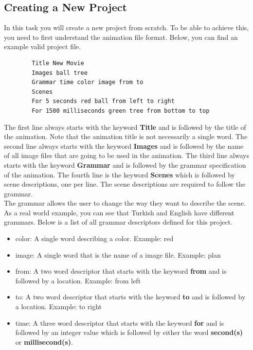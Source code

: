 \documentclass[a4paper]{article}
\begin{document}
	
	\subsection{Creating a New Project}
	In this task you will create a new project from scratch. To be able to achieve this, you need to first understand the animation file format. Below, you can find an example valid project file.\\
	\label{example}
	\begin{lstlisting}
		Title New Movie
		Images ball tree
		Grammar time color image from to
		Scenes
		For 5 seconds red ball from left to right
		For 1500 milliseconds green tree from bottom to top
	\end{lstlisting}
	
	The first line always starts with the keyword \textbf{Title} and is followed by the title of the animation. Note that the animation title is not necessarily a single word. The second line always starts with the keyword \textbf{Images} and is followed by the name of all image files that are going to be used in the animation. The third line always starts with the keyword \textbf{Grammar} and is followed by the grammar specification of the animation. The fourth line is the keyword \textbf{Scenes} which is followed by scene descriptions, one per line. The scene descriptions are required to follow the grammar.\\
	
	The grammar allows the user to change the way they want to describe the scene. As a real world example, you can see that Turkish and English have different grammars. Below is a list of all grammar descriptors defined for this project.
	\label{grammar}
	\begin{itemize}
		\item color: A single word describing a color. Example: red
		\item image: A single word that is the name of a image file. Example: plan
		\item from: A two word descriptor that starts with the keyword \textbf{from} and is followed by a location. Example: from left
		\item to: A two word descriptor that starts with the keyword \textbf{to} and is followed by a location. Example: to right
		\item time: A three word descriptor that starts with the keyword \textbf{for} and is followed by an integer value which is followed by either the word \textbf{second(s)} or \textbf{millisecond(s)}.
	\end{itemize}
\end{document}
